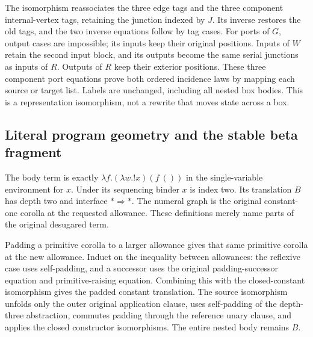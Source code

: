 

The isomorphism reassociates the three edge tags and the three component
internal-vertex tags, retaining the junction indexed by $J$. Its inverse
restores the old tags, and the two inverse equations follow by tag cases.
For ports of $G$, output cases are impossible; its inputs keep their original
positions. Inputs of $W$ retain the second input block, and its outputs become
the same serial junctions as inputs of $R$. Outputs of $R$ keep their exterior
positions. These three component port equations prove both ordered incidence
laws by mapping each source or target list. Labels are unchanged, including
all nested box bodies. This is a representation isomorphism, not a rewrite
that moves state across a box.


\subsection{Literal program geometry and the stable beta fragment}

The body term is exactly
$\lambda f.(\lambda w.!x)(f\ ())$ in the single-variable environment for $x$.
Under its sequencing binder $x$ is index two. Its translation $B$ has depth
two and interface $*\Rightarrow *$. The numeral graph is the original
constant-one corolla at the requested allowance. These definitions merely
name parts of the original desugared term.




Padding a primitive corolla to a larger allowance gives that same primitive
corolla at the new allowance. Induct on the inequality between allowances:
the reflexive case uses self-padding, and a successor uses the original
padding-successor equation and primitive-raising equation. Combining this
with the closed-constant isomorphism gives the padded constant translation.
The source isomorphism unfolds only the outer original application clause,
uses self-padding of the depth-three abstraction, commutes padding through
the reference unary clause, and applies the closed constructor isomorphisms.
The entire nested body remains $B$.


